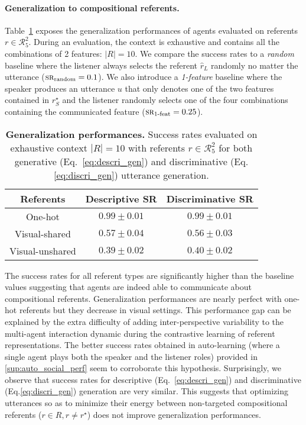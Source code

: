 \paragraph{Generalization to compositional referents. } Table~\ref{tab:generalization_perf} exposes the generalization performances of agents evaluated on referents $r \in \mathcal{R}_5^2$. During an evaluation, the context is exhaustive and contains all the combinations of 2 features: $|R|=10$. We compare the success rates to a \textit{random} baseline where the listener always selects the referent $\hat{r}_L$ randomly no matter the utterance ($\textsc{sr}_{\text{random}}=0.1$). We also introduce a \textit{1-feature} baseline where the speaker produces an utterance $u$ that only denotes one of the two features contained in $r_S^\star$ and the listener randomly selects one of the four combinations containing the communicated feature ($\textsc{sr}_{\text{1-feat}}=0.25$). 

\begin{table}[!h]
\small
    \centering
    \small
    \begin{tabular}{|c|c|c|}
        \hline
        \textbf{Referents} & \textbf{Descriptive} \textsc{SR} & \textbf{Discriminative} \textsc{SR}  \\
        \hline
         One-hot & $0.99\pm0.01$ & $0.99\pm0.01$ \\
         Visual-shared & $0.57\pm0.04$ & $0.56\pm0.03$ \\
         Visual-unshared & $0.39\pm0.02$ & $0.40\pm0.02$ \\
         \hline
    \end{tabular}
    \caption{\textbf{Generalization performances. } Success rates evaluated on exhaustive context $|R|=10$ with referents $r \in \mathcal{R}_5^2$ for both generative (Eq.~\ref{eq:descri_gen}) and discriminative (Eq.\ref{eq:discri_gen}) utterance generation.}
    \label{tab:generalization_perf}
\end{table}

The success rates for all referent types are significantly higher than the baseline values suggesting that agents are indeed able to communicate about compositional referents. Generalization performances are nearly perfect with one-hot referents but they decrease in visual settings. This performance gap can be explained by the extra difficulty of adding inter-perspective variability to the multi-agent interaction dynamic during the contrastive learning of referent representations. The better success rates obtained in auto-learning (where a single agent plays both the speaker and the listener roles) provided in \ap\ref{sup:auto_social_perf} seem to corroborate this hypothesis. Surprisingly, we observe that success rates for descriptive (Eq.~\ref{eq:descri_gen}) and discriminative (Eq.\ref{eq:discri_gen}) generation are very similar. This suggests that optimizing utterances so as to minimize their energy between non-targeted compositional referents ($r \in R, r \neq r^\star$) does not improve generalization performances.

